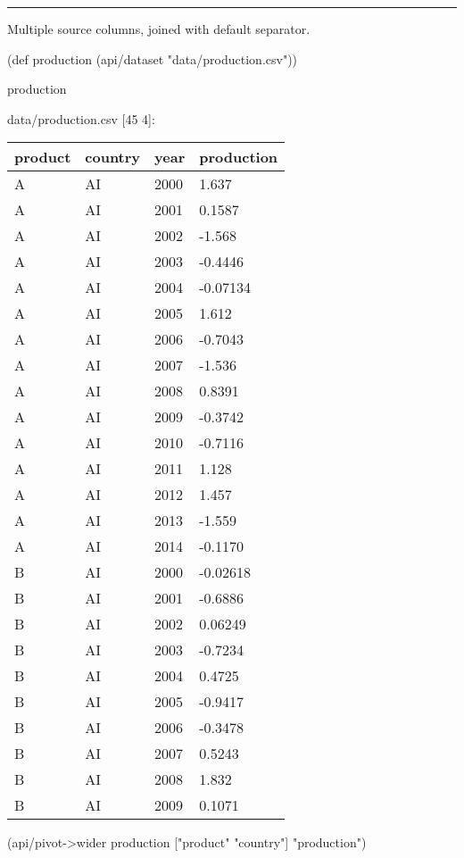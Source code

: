 \documentclass[]{article}
\newenvironment{Shaded}{\begin{snugshade}}{\end{snugshade}}
\newcommand{\StringTok}[1]{\textcolor[rgb]{0.31,0.60,0.02}{#1}}
\newcommand{\FunctionTok}[1]{\textcolor[rgb]{0.00,0.00,0.00}{#1}}
\newcommand{\BuiltInTok}[1]{#1}
\newcommand{\NormalTok}[1]{#1}
\begin{document}
\begin{center}\rule{0.5\linewidth}{0.5pt}\end{center}

Multiple source columns, joined with default separator.

\begin{Shaded}
\begin{Highlighting}[]
\NormalTok{(}\BuiltInTok{def}\FunctionTok{ production }\NormalTok{(api/dataset }\StringTok{"data/production.csv"}\NormalTok{))}
\end{Highlighting}
\end{Shaded}

\begin{Shaded}
\begin{Highlighting}[]
\NormalTok{production}
\end{Highlighting}
\end{Shaded}

data/production.csv {[}45 4{]}:

\begin{longtable}[]{@{}llll@{}}
\toprule
product & country & year & production\tabularnewline
\midrule
\endhead
A & AI & 2000 & 1.637\tabularnewline
A & AI & 2001 & 0.1587\tabularnewline
A & AI & 2002 & -1.568\tabularnewline
A & AI & 2003 & -0.4446\tabularnewline
A & AI & 2004 & -0.07134\tabularnewline
A & AI & 2005 & 1.612\tabularnewline
A & AI & 2006 & -0.7043\tabularnewline
A & AI & 2007 & -1.536\tabularnewline
A & AI & 2008 & 0.8391\tabularnewline
A & AI & 2009 & -0.3742\tabularnewline
A & AI & 2010 & -0.7116\tabularnewline
A & AI & 2011 & 1.128\tabularnewline
A & AI & 2012 & 1.457\tabularnewline
A & AI & 2013 & -1.559\tabularnewline
A & AI & 2014 & -0.1170\tabularnewline
B & AI & 2000 & -0.02618\tabularnewline
B & AI & 2001 & -0.6886\tabularnewline
B & AI & 2002 & 0.06249\tabularnewline
B & AI & 2003 & -0.7234\tabularnewline
B & AI & 2004 & 0.4725\tabularnewline
B & AI & 2005 & -0.9417\tabularnewline
B & AI & 2006 & -0.3478\tabularnewline
B & AI & 2007 & 0.5243\tabularnewline
B & AI & 2008 & 1.832\tabularnewline
B & AI & 2009 & 0.1071\tabularnewline
\bottomrule
\end{longtable}

\begin{Shaded}
\begin{Highlighting}[]
\NormalTok{(api/pivot->wider production [}\StringTok{"product"} \StringTok{"country"}\NormalTok{] }\StringTok{"production"}\NormalTok{)}
\end{Highlighting}
\end{Shaded}
\end{document}
